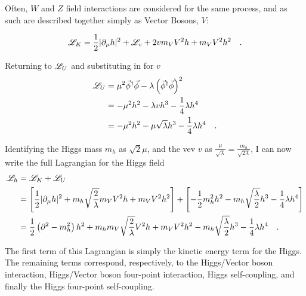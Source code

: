     Often, $W$ and $Z$ field interactions are considered for the same process,
        and as such are described together simply as Vector Bosons, $V$:

    \begin{equation} \begin{split}
        \mathscr{L}_K = \frac{1}{2} | \partial_{\mu}h |^2 + \mathscr{L}_v
            + 2 v m_V V^2 h + m_V V^2 h^2
        \quad.
    \end{split} \end{equation}

    Returning to $\mathscr{L}_U$ and substituting in for $v$
    \begin{equation} \begin{split}
        \mathscr{L}_U &= \mu^2 \vec{\phi}^\dag \vec{\phi} - \lambda \left( \vec{\phi}^\dag\vec{\phi} \right)^2
        \\&= - \mu^2 h^2 -\lambda v h^3 - \frac{1}{4} \lambda h^4
        \\&= - \mu^2 h^2 - \mu \sqrt\lambda h^3 - \frac{1}{4} \lambda h^4
        \quad.
    \end{split} \end{equation}

    Identifying the Higgs mass $m_h$ as $\sqrt{2}\mu$,
        and the vev $v$ as $\frac{\mu}{\sqrt{\lambda}} = \frac{m_h}{\sqrt{2 \lambda}}$,
        I can now write the full Lagrangian for the Higgs field\cite{Halzen_book}
    \begin{equation} \begin{split} \label{eq:higgsfull}
        \mathscr{L}_h &= \mathscr{L}_K + \mathscr{L}_U
        \\&= \left[ \frac{1}{2} | \partial_{\mu}h |^2
            + m_h \sqrt{\frac{2}{\lambda}}  m_V V^2 h + m_V V^2 h^2 \right]
            + \left[ - \frac{1}{2} m^2_h h^2 - m_h \sqrt{\frac{\lambda}{2}} h^3 - \frac{1}{4} \lambda h^4 \right]
        \\&= \frac{1}{2} \left(\partial^2 - m_h^2 \right) h^2
            + m_h m_V \sqrt{\frac{2}{\lambda}} V^2 h + m_V V^2 h^2
            - m_h \sqrt{\frac{\lambda}{2}} h^3 - \frac{1}{4} \lambda h^4
        \quad.
    \end{split} \end{equation}

    The first term of this Lagrangian is simply the kinetic energy term for the Higgs.
    The remaining terms correspond, respectively,
        to the Higgs/Vector boson interaction,
        Higgs/Vector boson four-point interaction,
        Higgs self-coupling,
        and finally the Higgs four-point self-coupling.

